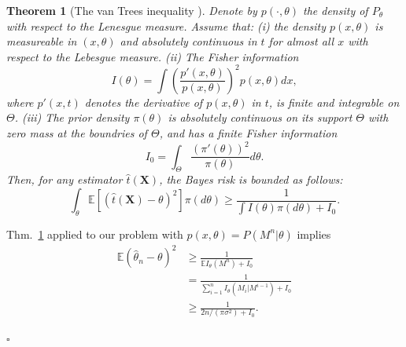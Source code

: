 \documentclass[letterpaper, conference,9pt]{IEEEtran}      %
\newtheorem{thm}{\bf{Theorem}}
\newcommand*{\QEDA}{\hfill\ensuremath{\square}}
\begin{document}
\begin{thm}[The van Trees inequality \cite{tsybakov2008introduction}] \label{thm:vanTrees}  Denote by $p(\cdot,\theta)$ the density of $P_\theta$ with respect to the Lenesgue measure. Assume that: (i) the density $p(x,\theta)$ is measureable in $(x,\theta)$ and absolutely continuous in $t$ for almost all $x$ with respect to the Lebesgue measure. (ii) The Fisher information
\[
I(\theta) = \int \left( \frac{p'(x,\theta)}{p(x,\theta)} \right)^2 p(x,\theta) dx,
\]
where $p'(x,t)$ denotes the derivative of $p(x,\theta)$ in $t$, is finite and integrable on $\Theta$. (iii) The prior density $\pi(\theta)$ is absolutely continuous on its support $\Theta$ with zero mass at the boundries of $\Theta$, and has a finite Fisher information
\[
I_0 = \int_{\Theta} \frac{\left( \pi'(\theta) \right)^2} {\pi(\theta)} d\theta.
\]
Then, for any estimator $\widehat{t}(\mathbf X)$, the Bayes risk is bounded as follows:
\[
\int_{\theta} \mathbb E \left[ \left( \widehat{t}(\mathbf X) - \theta\right)^2 \right] \pi(d\theta) \geq \frac{1}{ \int I(\theta) \pi(d \theta) + I_0 }.
\]
\end{thm}
Thm.~\ref{thm:vanTrees} applied to our problem with $p(x,\theta) = P(M^n|\theta)$ implies
\begin{align*}
\mathbb E \left(\widehat{\theta}_n - \theta \right)^2 &  \geq \frac{1}{ \mathbb E I_\theta(M^n) + I_0} \\
& = \frac{1}{ \sum_{i=1}^n I_\theta (M_i | M^{i-1} ) + I_0} \\
& \geq \frac{1}{ 2n/(\pi \sigma^2) + I_0}.
\end{align*}

\QEDA
\end{document}

